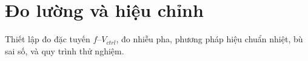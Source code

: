 \chapter{Đo lường và hiệu chỉnh}
Thiết lập đo đặc tuyến \(f\)–\(V_{ctrl}\), đo nhiễu pha, phương pháp hiệu chuẩn nhiệt, bù sai số, và quy trình thử nghiệm.


